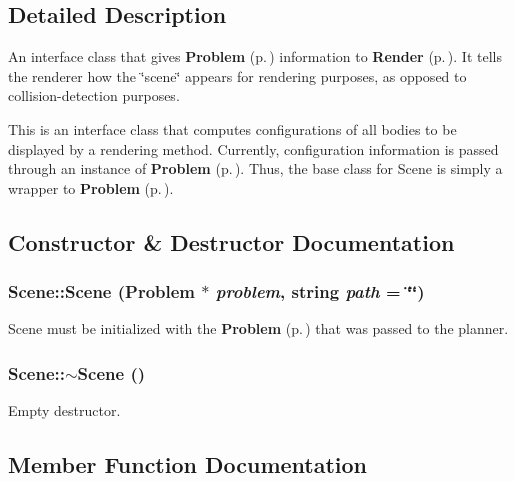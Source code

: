 \subsection{Detailed Description}
An interface class that gives {\bf Problem} {\rm (p.\,\pageref{classProblem})} information to {\bf Render} {\rm (p.\,\pageref{classRender})}. It tells the renderer how the \char`\"{}scene\char`\"{} appears for rendering purposes, as opposed to collision-detection purposes.

This is an interface class that computes configurations of all bodies to be displayed by a rendering method. Currently, configuration information is passed through an instance of {\bf Problem} {\rm (p.\,\pageref{classProblem})}. Thus, the base class for Scene is simply a wrapper to {\bf Problem} {\rm (p.\,\pageref{classProblem})}. 



\subsection{Constructor \& Destructor Documentation}
\subsubsection{\setlength{\rightskip}{0pt plus 5cm}Scene::Scene ({\bf Problem} $\ast$ {\em problem}, string {\em path} = \char`\"{}\char`\"{})}\label{classScene_a0}


Scene must be initialized with the {\bf Problem} {\rm (p.\,\pageref{classProblem})} that was passed to the planner.

\subsubsection{\setlength{\rightskip}{0pt plus 5cm}Scene::$\sim$Scene ()\hspace{0.3cm}{\tt  [inline, virtual]}}\label{classScene_a1}


Empty destructor.



\subsection{Member Function Documentation}
